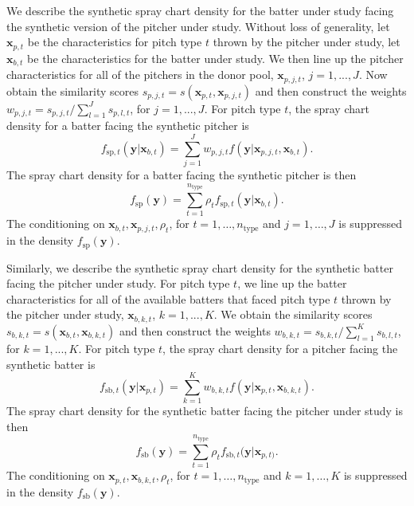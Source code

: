 \documentclass[12pt]{article}
\newcommand{\y}{\textbf{y}}
\newcommand{\x}{\textbf{x}}
\begin{document}
We describe the synthetic spray chart density for the batter under study facing the synthetic version of the pitcher under study. Without loss of generality, let $\x_{p,t}$ be the characteristics for pitch type $t$ thrown by the pitcher under study, let $\x_{b,t}$ be the characteristics for the batter under study. We then line up the pitcher characteristics for all of the pitchers in the donor pool, $\x_{p,j,t}$, $j = 1,...,J$. Now obtain the similarity scores $s_{p,j,t} = s(\x_{p,t},\x_{p,j,t})$ and then construct the weights $w_{p,j,t} = s_{p,j,t} / \sum_{l=1}^{J}s_{p,l,t}$, for $j = 1,...,J$. For pitch type $t$, the spray chart density for a batter facing the synthetic pitcher is
\begin{equation} \label{synth-pitch-t}
  f_{\text{sp}, t}(\y|\x_{b,t}) = \sum_{j=1}^J w_{p,j,t}f(\y|\x_{p,j,t},\x_{b,t}).
\end{equation}
The spray chart density for a batter facing the synthetic pitcher is then
\begin{equation} \label{synth-pitch}
  f_{\text{sp}}(\y) = \sum_{t=1}^{n_{\text{type}}} \rho_t f_{\text{sp},t}(\y|\x_{b,t}).
\end{equation}
The conditioning on $\x_{b,t}, \x_{p,j,t}, \rho_t$, for $t = 1,\ldots,n_{\text{type}}$ and $j = 1,\ldots,J$ is suppressed in the density $f_{\text{sp}}(\y)$.

Similarly, we describe the synthetic spray chart density for the synthetic batter facing the pitcher under study. For pitch type $t$, we line up the batter characteristics for all of the available batters that faced pitch type $t$ thrown by the pitcher under study, $\x_{b,k,t}$, $k = 1,...,K$.  We obtain the similarity scores $s_{b,k,t} = s(\x_{b,t},\x_{b,k,t})$ and then construct the weights $w_{b,k,t} = s_{b,k,t} / \sum_{l=1}^{K}s_{b,l,t}$, for $k = 1,...,K$. For pitch type $t$, the spray chart density for a pitcher facing the synthetic batter is
\begin{equation} \label{synth-bat-t}
  f_{\text{sb},t}(\y|\x_{p,t}) = \sum_{k=1}^K w_{b,k,t}f(\y|\x_{p,t},\x_{b,k,t}).
\end{equation}
The spray chart density for the synthetic batter facing the pitcher under study is then
\begin{equation} \label{synth-bat}
  f_{\text{sb}}(\y) = \sum_{t=1}^{n_{\text{type}}} \rho_t f_{\text{sb},t}(\y|\x_{p,t)}.
\end{equation}
The conditioning on $\x_{p,t}, \x_{b,k,t}, \rho_t$, for $t = 1,\ldots,n_{\text{type}}$ and $k = 1,\ldots,K$ is suppressed in the density $f_{\text{sb}}(\y)$.
\end{document}
